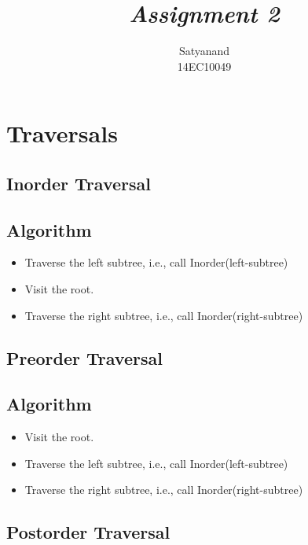 \documentclass[12pt]{article}
\title{{\it Assignment 2\/} }
\author
{Satyanand\\
14EC10049
}
\date{}
\begin{document}
 
\maketitle



 

\section*{Traversals}
\subsection*{Inorder Traversal}




\subsection*{Algorithm}
\begin{itemize}

   \item Traverse the left subtree, i.e., call Inorder(left-subtree)
    \item Visit the root.
  \item  Traverse the right subtree, i.e., call Inorder(right-subtree)

\end{itemize}
\subsection*{Preorder Traversal}




\subsection*{Algorithm}
\begin{itemize}
\item Visit the root.
   \item Traverse the left subtree, i.e., call Inorder(left-subtree)
  \item  Traverse the right subtree, i.e., call Inorder(right-subtree)

\end{itemize}

\subsection*{Postorder Traversal}
\end{document}
